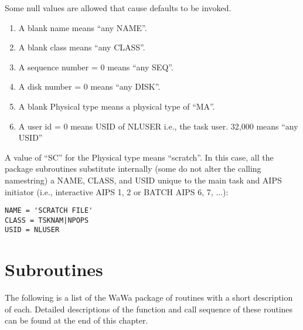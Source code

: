 Some null values are allowed that cause defaults to be invoked.
\begin{enumerate} %
\item A blank name means ``any NAME''.
\item A blank class means ``any CLASS''.
\item A sequence number = 0 means ``any SEQ''.
\item A disk number = 0 means ``any DISK''.
\item A blank Physical type means a physical type of ``MA''.
\item A user id = 0 means USID of NLUSER i.e., the task user.  32,000
means ``any USID''

\end{enumerate} %
A value of ``SC'' for the Physical type means ``scratch''.
In this case, all the package subroutines substitute internally (some
do not alter the calling namestring) a NAME, CLASS, and USID unique to
the main task and AIPS initiator (i.e., interactive AIPS 1, 2 or
BATCH AIPS 6, 7, ...):
\begin{verbatim}
NAME = 'SCRATCH FILE'
CLASS = TSKNAM|NPOPS
USID = NLUSER
\end{verbatim}

\section{Subroutines}
The following is a list of the WaWa package of routines with a short
description of each.  Detailed descriptions of the function and call
sequence of these routines can be found at the end of this chapter.

